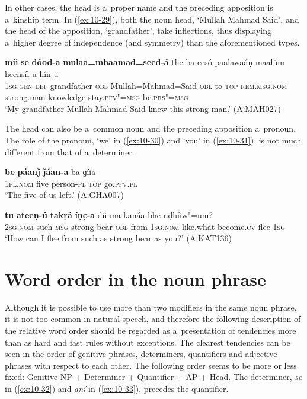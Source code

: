 In other cases, the head is a~proper name and the preceding apposition is a~kinship term. In (\ref{ex:10-29}), both the noun head, `Mullah Mahmad Said', and the head of the apposition, `grandfather', take inflections, thus displaying a~higher degree of independence (and symmetry) than the aforementioned types. 
\begin{exe}
\ex
\label{ex:10-29}
\gll \textbf{míi} \textbf{se} \textbf{dóod-a} \textbf{mulaa=mhaamad=seed-á} the ba eesó paalawaáṇ maalúm heensíl-u hín-u\\
\textsc{1sg.gen} \textsc{def} grandfather-\textsc{obl} Mullah=Mahmad=Said-\textsc{obl} to  \textsc{top} \textsc{rem.msg.nom} strong.man knowledge  stay.\textsc{pfv"=msg} be.\textsc{prs"=msg}\\
\glt `My grandfather Mullah Mahmad Said knew this strong man.' (A:MAH027)
\end{exe}


The head can also be a~common noun and the preceding apposition a~pronoun. The role of the pronoun, `we' in (\ref{ex:10-30}) and `you' in (\ref{ex:10-31}), is not much different from that of a~determiner. 

\begin{exe}
\ex
\label{ex:10-30}
\gll \textbf{be} \textbf{páanǰ} \textbf{ǰáan-a} ba ɡíia \\
\textsc{1pl.nom} five person-\textsc{pl} \textsc{top} go.\textsc{pfv.pl}  \\
\glt `The five of us left.' (A:GHA007)

\ex
\label{ex:10-31}
\gll \textbf{tu} \textbf{ateeṇ-ú} \textbf{takṛá} \textbf{íṇc̣-a} díi ma kanáa bhe uḍhíiw"=um? \\
\textsc{2sg.nom} such-\textsc{msg} strong bear-\textsc{obl} from \textsc{1sg.nom}  like.what become.\textsc{cv} flee-\textsc{1sg} \\
\glt `How can I flee from such as strong bear as you?' (A:KAT136)
\end{exe}

\section{Word order in the noun phrase}
\label{sec:10-2}


Although it is possible to use more than two modifiers in the same noun phrase, it is not too common in natural speech, and therefore the following description of the relative word order should be regarded as a~presentation of tendencies more than as hard and fast rules without exceptions. The clearest tendencies can be seen in the order of genitive phrases, determiners, quantifiers and adjective phrases with respect to each other. The following order seems to be more or less fixed: Genitive NP + Determiner + Quantifier + AP + Head. The determiner, \textit{se} in (\ref{ex:10-32}) and \textit{aní} in (\ref{ex:10-33}), precedes the quantifier.

